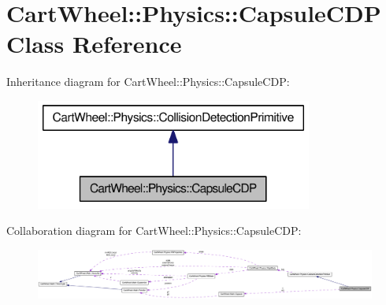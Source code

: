 \hypertarget{classCartWheel_1_1Physics_1_1CapsuleCDP}{
\section{CartWheel::Physics::CapsuleCDP Class Reference}
\label{classCartWheel_1_1Physics_1_1CapsuleCDP}
}


Inheritance diagram for CartWheel::Physics::CapsuleCDP:\nopagebreak
\begin{figure}[H]
\begin{center}
\leavevmode
\includegraphics[width=258pt]{classCartWheel_1_1Physics_1_1CapsuleCDP__inherit__graph}
\end{center}
\end{figure}


Collaboration diagram for CartWheel::Physics::CapsuleCDP:\nopagebreak
\begin{figure}[H]
\begin{center}
\leavevmode
\includegraphics[width=400pt]{classCartWheel_1_1Physics_1_1CapsuleCDP__coll__graph}
\end{center}
\end{figure}
